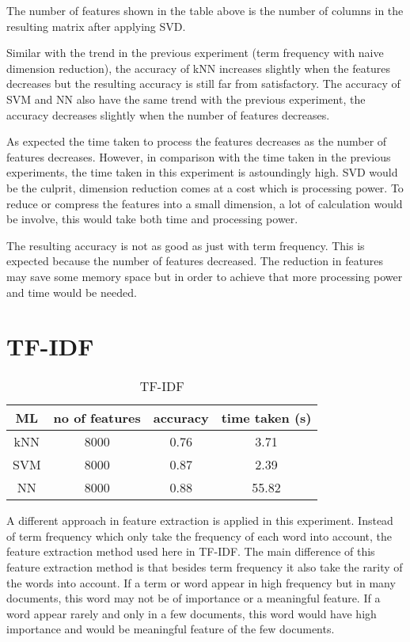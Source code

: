 The number of features shown in the table above is the number of columns in the resulting matrix after applying SVD. 

Similar with the trend in the previous experiment (term frequency with naive dimension reduction), the accuracy of kNN increases slightly when the features decreases but the resulting accuracy is still far from satisfactory. The accuracy of SVM and NN also have the same trend with the previous experiment, the accuracy decreases slightly when the number of features decreases. 

As expected the time taken to process the features decreases as the number of features decreases. However, in comparison with the time taken in the previous experiments, the time taken in this experiment is astoundingly high. SVD would be the culprit, dimension reduction comes at a cost which is processing power. To reduce or compress the features into a small dimension, a lot of calculation would be involve, this would take both time and processing power.

The resulting accuracy is not as good as just with term frequency. This is expected because the number of features decreased. The reduction in features may save some memory space but in order to achieve that more processing power and time would be needed.

\section{TF-IDF}

\begin{table} [ht]
	\centering
	\begin{tabular}{|| c | c | c | c||}
		\hline
		ML & no of features & accuracy & time taken (s) \\ [0.5ex]
		\hline\hline
		kNN & 8000 & 0.76 & 3.71 \\ 
		\hline
		SVM & 8000 & 0.87 & 2.39 \\
		\hline
		NN & 8000 & 0.88 & 55.82 \\
		\hline
	\end{tabular}
\caption{TF-IDF}
\label{tbl:tfidf}
\end{table}

A different approach in feature extraction is applied in this experiment. Instead of term frequency which only take the frequency of each word into account, the feature extraction method used here in TF-IDF. The main difference of this feature extraction method is that besides term frequency it also take the rarity of the words into account. If a term or word appear in high frequency but in many documents, this word may not be of importance or a meaningful feature. If a word appear rarely and only in a few documents, this word would have high importance and would be meaningful feature of the few documents.

